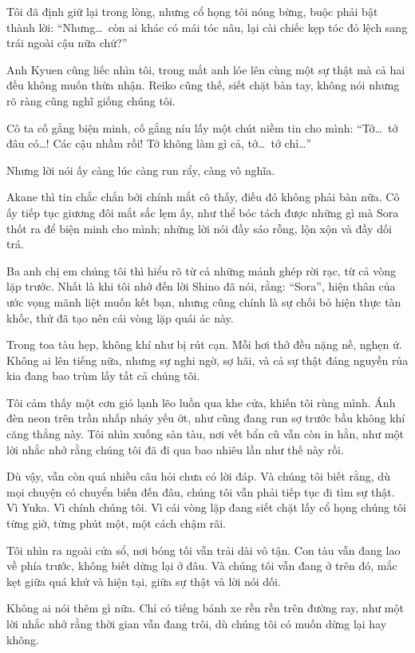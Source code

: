 \documentclass[../main.tex]{subfiles}
\begin{document}
Tôi đã định giữ lại trong lòng, nhưng cổ họng tôi nóng bừng, buộc phải bật thành lời: ``Nhưng\dots\ còn ai khác có mái tóc nâu, lại cài chiếc kẹp tóc đỏ lệch sang trái ngoài cậu nữa chứ?''

Anh Kyuen cũng liếc nhìn tôi, trong mắt anh lóe lên cùng một sự thật mà cả hai đều không muốn thừa nhận. Reiko cũng thế, siết chặt bàn tay, không nói nhưng rõ ràng cũng nghĩ giống chúng tôi.

Cô ta cố gắng biện minh, cố gắng níu lấy một chút niềm tin cho mình: ``Tớ\dots\ tớ đâu có\dots! Các cậu nhầm rồi! Tớ không làm gì cả, tớ\dots\ tớ chỉ\dots''

Nhưng lời nói ấy càng lúc càng run rẩy, càng vô nghĩa.

Akane thì tin chắc chắn bởi chính mắt cô thấy, điều đó không phải bàn nữa. Cô ấy tiếp tục giương đôi mắt sắc lẹm ấy, như thể bóc tách được những gì mà Sora thốt ra để biện minh cho mình; những lời nói đầy sáo rỗng, lộn xộn và đầy dối trá.


Ba anh chị em chúng tôi thì hiểu rõ từ cả những mảnh ghép rời rạc, từ cả vòng lặp trước. Nhất là khi tôi nhớ đến lời Shino đã nói, rằng: ``Sora'', hiện thân của ước vọng mãnh liệt muốn kết bạn, nhưng cũng chính là sự chối bỏ hiện thực tàn khốc, thứ đã tạo nên cái vòng lặp quái ác này.

Trong toa tàu hẹp, không khí như bị rút cạn. Mỗi hơi thở đều nặng nề, nghẹn ứ. Không ai lên tiếng nữa, nhưng sự nghi ngờ, sợ hãi, và cả sự thật đáng nguyền rủa kia đang bao trùm lấy tất cả chúng tôi.

Tôi cảm thấy một cơn gió lạnh lẽo luồn qua khe cửa, khiến tôi rùng mình. Ánh đèn neon trên trần nhấp nháy yếu ớt, như cũng đang run sợ trước bầu không khí căng thẳng này. Tôi nhìn xuống sàn tàu, nơi vết bẩn cũ vẫn còn in hằn, như một lời nhắc nhở rằng chúng tôi đã đi qua bao nhiêu lần như thế này rồi.

Dù vậy, vẫn còn quá nhiều câu hỏi chưa có lời đáp. Và chúng tôi biết rằng, dù mọi chuyện có chuyển biến đến đâu, chúng tôi vẫn phải tiếp tục đi tìm sự thật. Vì Yuka. Vì chính chúng tôi. Vì cái vòng lặp đang siết chặt lấy cổ họng chúng tôi từng giờ, từng phút một, một cách chậm rãi.

Tôi nhìn ra ngoài cửa sổ, nơi bóng tối vẫn trải dài vô tận. Con tàu vẫn đang lao về phía trước, không biết dừng lại ở đâu. Và chúng tôi vẫn đang ở trên đó, mắc kẹt giữa quá khứ và hiện tại, giữa sự thật và lời nói dối.

Không ai nói thêm gì nữa. Chỉ có tiếng bánh xe rền rền trên đường ray, như một lời nhắc nhở rằng thời gian vẫn đang trôi, dù chúng tôi có muốn dừng lại hay không.
\end{document}
